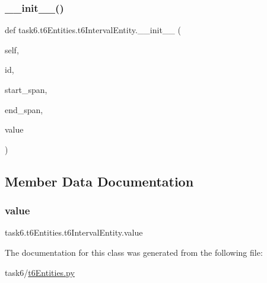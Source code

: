 \subsubsection{\texorpdfstring{\+\_\+\+\_\+init\+\_\+\+\_\+()}{\_\_init\_\_()}}
{\footnotesize\ttfamily def task6.\+t6\+Entities.\+t6\+Interval\+Entity.\+\_\+\+\_\+init\+\_\+\+\_\+ (\begin{DoxyParamCaption}\item[{}]{self,  }\item[{}]{id,  }\item[{}]{start\+\_\+span,  }\item[{}]{end\+\_\+span,  }\item[{}]{value }\end{DoxyParamCaption})}



\subsection{Member Data Documentation}
\mbox{\label{classtask6_1_1t6Entities_1_1t6IntervalEntity_a002714e201e05948aca8cce83d4a9da6}} 
\subsubsection{\texorpdfstring{value}{value}}
{\footnotesize\ttfamily task6.\+t6\+Entities.\+t6\+Interval\+Entity.\+value}



The documentation for this class was generated from the following file\+:\begin{DoxyCompactItemize}
\item 
task6/\hyperlink{t6Entities_8py}{t6\+Entities.\+py}\end{DoxyCompactItemize}
